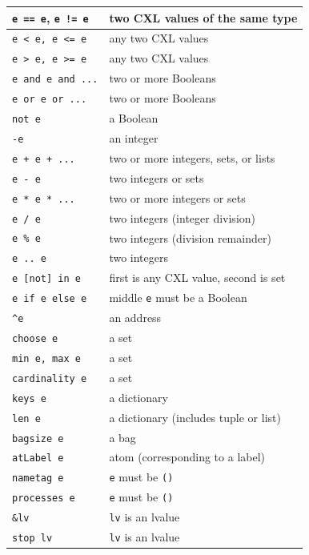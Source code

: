 \documentclass{report}
\begin{document}
\vspace{1em}
\begin{tabular}{|l|l|}
\hline
\texttt{e == e}, \texttt{e != e} & two CXL values of the same type \\
\hline
\texttt{e < e, e <= e} & any two CXL values \\
\hline
\texttt{e > e, e >= e} & any two CXL values \\
\hline
\texttt{e and e and ...} & two or more Booleans \\
\hline
\texttt{e or e or ...} & two or more Booleans \\
\hline
\texttt{not e} & a Boolean \\
\hline
\texttt{-e} & an integer \\
\hline
\texttt{e + e + ...} & two or more integers, sets, or lists \\
\hline
\texttt{e - e} & two integers or sets \\
\hline
\texttt{e * e * ...} & two or more integers or sets \\
\hline
\texttt{e / e} & two integers (integer division) \\
\hline
\texttt{e \% e} & two integers (division remainder) \\
\hline
\texttt{e~..~e} & two integers \\
\hline
\texttt{e [not] in e} & first is any CXL value, second is set \\
\hline
\texttt{e if e else e} & middle \texttt{e} must be a Boolean \\
\hline
\texttt{\^{}e} & an address \\
\hline
\texttt{choose e} & a set \\
\hline
\texttt{min e, max e} & a set \\
\hline
\texttt{cardinality e} & a set \\
\hline
\texttt{keys e} & a dictionary \\
\hline
\texttt{len e} & a dictionary (includes tuple or list) \\
\hline
\texttt{bagsize e} & a bag \\
\hline
\texttt{atLabel e} & atom (corresponding to a label) \\
\hline
\texttt{nametag e} & \texttt{e} must be \texttt{()} \\
\hline
\texttt{processes e} & \texttt{e} must be \texttt{()} \\
\hline
\texttt{\&lv} & \texttt{lv} is an lvalue \\
\hline
\texttt{stop lv} & \texttt{lv} is an lvalue \\
\hline
\end{tabular}
\vspace{1em}
\end{document}
